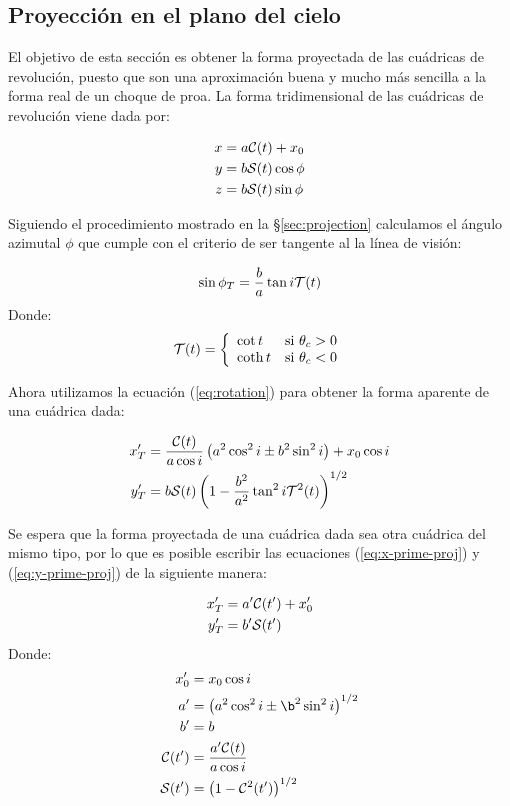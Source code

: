 \subsection{Proyección en el plano del cielo}

El objetivo de esta sección es obtener la forma proyectada de las cuádricas de revolución, puesto que son una aproximación buena y mucho más sencilla a la forma real de un choque de proa. La forma tridimensional de las cuádricas de revolución viene dada por:

\begin{align}
  x &= a\mathcal{C}(t) + x_0 \\
  y &= b\mathcal{S}(t)\cos\phi \\
  z &= b\mathcal{S}(t)\sin\phi
\end{align}

Siguiendo el procedimiento mostrado en la \S \ref{sec:projection} calculamos el ángulo azimutal $\phi$ que cumple con el criterio de ser tangente al la línea de visión:

\begin{align}
  \sin\phi_T = \frac{b}{a}\tan i\mathcal{T}(t) 
\end{align}
Donde:
\begin{align}
  \mathcal{T}(t) = \left\lbrace
  \begin{array}{lr}
    \cot t & \mathrm{si}~\theta_c > 0 \\
    \coth t & \mathrm{si}~\theta_c < 0 
  \end{array}
  \right.
\end{align}

Ahora utilizamos la ecuación (\ref{eq:rotation}) para obtener la forma aparente de una cuádrica dada:

\begin{align}
  x'_T &= \frac{\mathcal{C}(t)}{a\cos i}\left(a^2\cos^2 i \pm b^2\sin^2 i\right) + x_0\cos i
  \label{eq:x-prime-proj}\\
  y'_T &= b\mathcal{S}(t)\left(1 - \frac{b^2}{a^2}\tan^2 i\mathcal{T}^2(t)\right)^{1/2}
  \label{eq:y-prime-proj}
\end{align}

Se espera que la forma proyectada de una cuádrica dada sea otra cuádrica del mismo tipo, por lo que es posible escribir las ecuaciones (\ref{eq:x-prime-proj}) y (\ref{eq:y-prime-proj}) de la siguiente manera: 

\begin{align}
  x'_T &= a'\mathcal{C}(t') + x'_0 \label{eq:xtprime}\\
  y'_T &= b'\mathcal{S}(t') \label{eq:ytprime}
\end{align}
Donde:
\begin{align}
  x'_0 &= x_0\cos i \\
  a' &= \left(a^2\cos^2 i \pm \b^2\sin^2 i\right)^{1/2} \label{eq:a-prime}\\
  b' &= b \label{eq:b-prime}\\
  \Cos(t') &= \frac{a'\Cos(t)}{a\cos i} \\
  \Sin(t') &= \left(1 - \Cos^2(t')\right)^{1/2}
\end{align}

